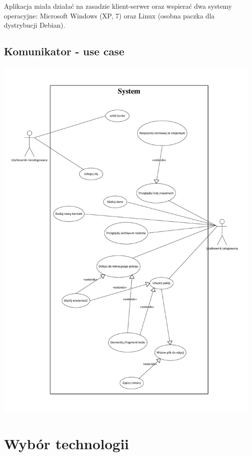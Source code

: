 \documentclass[polish,11pt,a4paper,twoside]{article}
\begin{document}

Aplikacja miała działać na zasadzie klient-serwer oraz wspierać dwa systemy operacyjne: Microsoft Windows (XP, 7) oraz Linux (osobna paczka dla dystrybucji Debian).
\clearpage
\subsection{Komunikator - use case}
\includegraphics[scale=0.65]{pdf/use_case.pdf}



\section{Wybór technologii}
\end{document}
